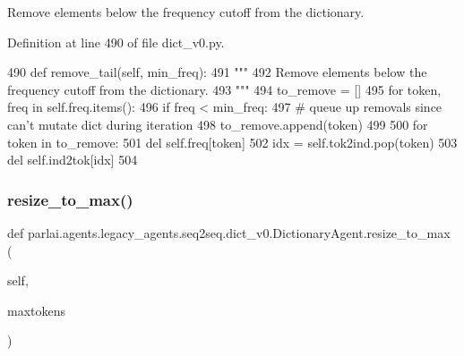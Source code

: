 \begin{DoxyVerb}Remove elements below the frequency cutoff from the dictionary.
\end{DoxyVerb}
 

Definition at line 490 of file dict\+\_\+v0.\+py.


\begin{DoxyCode}
490     \textcolor{keyword}{def }remove\_tail(self, min\_freq):
491         \textcolor{stringliteral}{"""}
492 \textcolor{stringliteral}{        Remove elements below the frequency cutoff from the dictionary.}
493 \textcolor{stringliteral}{        """}
494         to\_remove = []
495         \textcolor{keywordflow}{for} token, freq \textcolor{keywordflow}{in} self.freq.items():
496             \textcolor{keywordflow}{if} freq < min\_freq:
497                 \textcolor{comment}{# queue up removals since can't mutate dict during iteration}
498                 to\_remove.append(token)
499 
500         \textcolor{keywordflow}{for} token \textcolor{keywordflow}{in} to\_remove:
501             del self.freq[token]
502             idx = self.tok2ind.pop(token)
503             del self.ind2tok[idx]
504 
\end{DoxyCode}
\mbox{\label{classparlai_1_1agents_1_1legacy__agents_1_1seq2seq_1_1dict__v0_1_1DictionaryAgent_ab5351c542cbfdeeb9a2bc24227253fb3}} 
\subsubsection{\texorpdfstring{resize\+\_\+to\+\_\+max()}{resize\_to\_max()}}
{\footnotesize\ttfamily def parlai.\+agents.\+legacy\+\_\+agents.\+seq2seq.\+dict\+\_\+v0.\+Dictionary\+Agent.\+resize\+\_\+to\+\_\+max (\begin{DoxyParamCaption}\item[{}]{self,  }\item[{}]{maxtokens }\end{DoxyParamCaption})}

